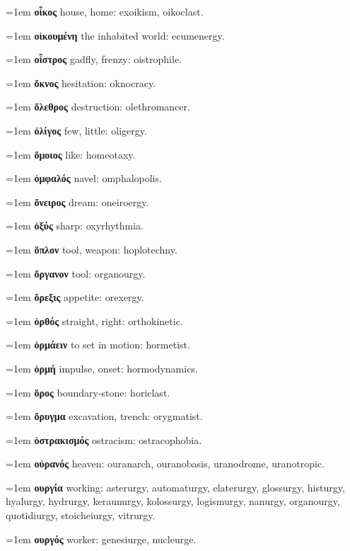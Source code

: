 \hangindent=1em \textbf{οἶκος} house, home: exoikism, oikoclast.\par
\hangindent=1em \textbf{οἰκουμένη} the inhabited world: ecumenergy.\par
\hangindent=1em \textbf{οἶστρος} gadfly, frenzy: oistrophile.\par
\hangindent=1em \textbf{ὄκνος} hesitation: oknocracy.\par
\hangindent=1em \textbf{ὄλεθρος} destruction: olethromancer.\par
\hangindent=1em \textbf{ὀλίγος} few, little: oligergy.\par
\hangindent=1em \textbf{ὅμοιος} like: homeotaxy.\par
\hangindent=1em \textbf{ὀμφαλός} navel: omphalopolis.\par
\hangindent=1em \textbf{ὄνειρος} dream: oneiroergy.\par
\hangindent=1em \textbf{ὀξύς} sharp: oxyrhythmia.\par
\hangindent=1em \textbf{ὅπλον} tool, weapon: hoplotechny.\par
\hangindent=1em \textbf{ὄργανον} tool: organourgy.\par
\hangindent=1em \textbf{ὄρεξις} appetite: orexergy.\par
\hangindent=1em \textbf{ὀρθός} straight, right: orthokinetic.\par
\hangindent=1em \textbf{ὁρμάειν} to set in motion: hormetist.\par
\hangindent=1em \textbf{ὁρμή} impulse, onset: hormodynamics.\par
\hangindent=1em \textbf{ὅρος} boundary-stone: horiclast.\par
\hangindent=1em \textbf{ὄρυγμα} excavation, trench: orygmatist.\par
\hangindent=1em \textbf{ὀστρακισμός} ostracism: ostracophobia.\par
\hangindent=1em \textbf{οὐρανός} heaven: ouranarch, ouranobasis, uranodrome, uranotropic.\par
\hangindent=1em \textbf{ουργία} working: asterurgy, automaturgy, elaterurgy, glossurgy, histurgy, hyalurgy, hydrurgy, keraunurgy, kolossurgy, logismurgy, nanurgy, organourgy, quotidiurgy, stoicheiurgy, vitrurgy.\par
\hangindent=1em \textbf{ουργός} worker: genesiurge, nucleurge.\par

